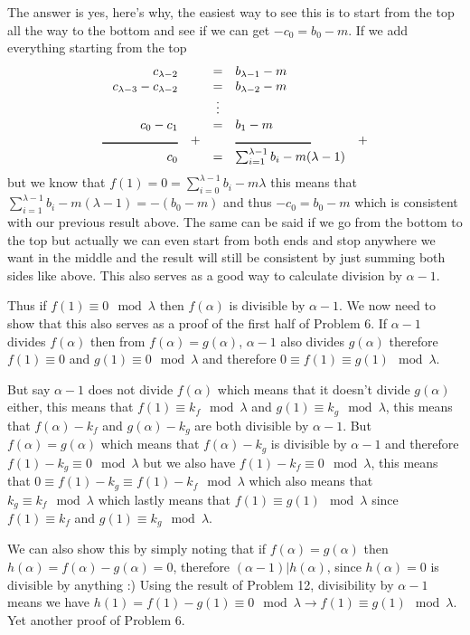 \documentclass[aps,preprint,preprintnumbers,nofootinbib,showpacs,prd]{revtex4-1}
\newcommand{\nbea}{\begin{eqnarray*}}
\newcommand{\neea}{\end{eqnarray*}}
\begin{document}
The answer is yes, here's why, the easiest way to see this is to start from the top all the way to the bottom and see if we can get $-c_0 = b_0 - m$. If we add everything starting from the top
%
\nbea
\begin{array}{r c c l c}
c_{\lambda - 2} & ~ & = & b_{\lambda - 1} - m & ~ \\
c_{\lambda - 3} - c_{\lambda - 2} & ~ & = & b_{\lambda-2} - m  & ~ \\
& ~ & \vdots & \\
c_0 - c_1 & ~ & = & b_1 - m  & ~ \\
\rule[0pt]{60pt}{1pt} & + & & \rule[0pt]{60pt}{1pt} & + \\
c_0 & & = & \sum_{i = 1}^{\lambda - 1} b_i - m(\lambda - 1) &
\end{array}
\neea
%
but we know that $f(1) = 0 = \sum_{i = 0}^{\lambda - 1} b_i - m\lambda$ this means that $\sum_{i = 1}^{\lambda - 1} b_i - m(\lambda - 1) = -(b_0 - m)$ and thus $-c_0 = b_0 - m$ which is consistent with our previous result above. The same can be said if we go from the bottom to the top but actually we can even start from both ends and stop anywhere we want in the middle and the result will still be consistent by just summing both sides like above. This also serves as a good way to calculate division by $\alpha - 1$.

Thus if $f(1) \equiv 0 \mod{\lambda}$ then $f(\alpha)$ is divisible by $\alpha - 1$. We now need to show that this also serves as a proof of the first half of Problem 6. If $\alpha - 1$ divides $f(\alpha)$ then from $f(\alpha) = g(\alpha)$, $\alpha - 1$ also divides $g(\alpha)$ therefore $f(1) \equiv 0$ and $g(1) \equiv 0 \mod{\lambda}$ and therefore $0 \equiv f(1) \equiv g(1) \mod{\lambda}$. 

But say $\alpha - 1$ does not divide $f(\alpha)$ which means that it doesn't divide $g(\alpha)$ either, this means that $f(1) \equiv k_f \mod{\lambda}$ and $g(1) \equiv k_g \mod{\lambda}$, this means that $f(\alpha) - k_f$ and $g(\alpha) - k_g$ are both divisible by $\alpha - 1$. But $f(\alpha) = g(\alpha)$ which means that $f(\alpha) - k_g$ is divisible by $\alpha - 1$ and therefore $f(1) - k_g \equiv 0 \mod{\lambda}$ but we also have $f(1) - k_f \equiv 0 \mod{\lambda}$, this means that $0 \equiv f(1) - k_g \equiv f(1) - k_f \mod{\lambda}$ which also means that $k_g \equiv k_f \mod{\lambda}$ which lastly means that $f(1) \equiv g(1) \mod{\lambda}$ since $f(1) \equiv k_f$ and $g(1) \equiv k_g \mod{\lambda}$.

We can also show this by simply noting that if $f(\alpha) = g(\alpha)$ then $h(\alpha) = f(\alpha) - g(\alpha) = 0$, therefore $(\alpha - 1)|h(\alpha)$, since $h(\alpha) = 0$ is divisible by anything :) Using the result of Problem 12, divisibility by $\alpha - 1$ means we have $h(1) = f(1) - g(1) \equiv 0 \mod{\lambda} \to f(1) \equiv g(1) \mod{\lambda}$. Yet another proof of Problem 6.
\end{document}
